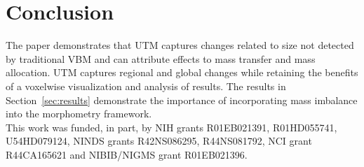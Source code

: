 \documentclass{llncs}
\begin{document}
\section{Conclusion}
The paper demonstrates that UTM captures changes related to size not detected
by traditional VBM and can attribute effects to mass transfer and mass
allocation. UTM captures regional and global changes while retaining the
benefits of a voxelwise visualization and analysis of results.  The results in
Section~\ref{sec:results} demonstrate the importance of incorporating mass
imbalance into the morphometry framework.  \\

 This work was funded, in part, by NIH grants
R01EB021391, R01HD055741, U54HD079124, NINDS grants R42NS086295,
R44NS081792, NCI grant R44CA165621 and NIBIB/NIGMS grant R01EB021396.
\vspace{-0.15in}


\end{document}
